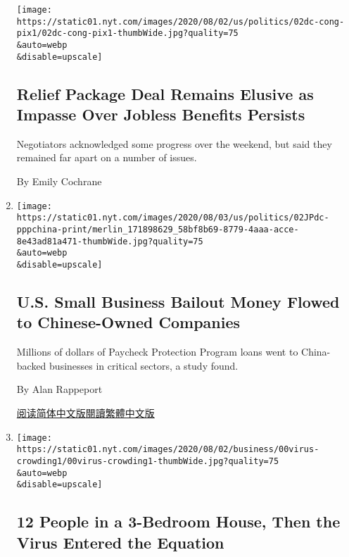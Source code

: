 \begin{enumerate}
  \texttt{[image: https://static01.nyt.com/images/2020/08/02/us/politics/02dc-cong-pix1/02dc-cong-pix1-thumbWide.jpg?quality=75\\\&auto=webp\\\&disable=upscale]}

  \hypertarget{relief-package-deal-remains-elusive-as-impasse-over-jobless-benefits-persists}{%
  \subsection{Relief Package Deal Remains Elusive as Impasse Over
  Jobless Benefits
  Persists}\label{relief-package-deal-remains-elusive-as-impasse-over-jobless-benefits-persists}}

  Negotiators acknowledged some progress over the weekend, but said they
  remained far apart on a number of issues.

  By Emily Cochrane
\item
  \href{/2020/08/02/us/politics/virus-china-ppp-small-business-loans.html}{}

  \texttt{[image: https://static01.nyt.com/images/2020/08/03/us/politics/02JPdc-pppchina-print/merlin\_171898629\_58bf8b69-8779-4aaa-acce-8e43ad81a471-thumbWide.jpg?quality=75\\\&auto=webp\\\&disable=upscale]}

  \hypertarget{us-small-business-bailout-money-flowed-to-chinese-owned-companies}{%
  \subsection{U.S. Small Business Bailout Money Flowed to Chinese-Owned
  Companies}\label{us-small-business-bailout-money-flowed-to-chinese-owned-companies}}

  Millions of dollars of Paycheck Protection Program loans went to
  China-backed businesses in critical sectors, a study found.

  By Alan Rappeport

  \href{https://cn.nytimes.com/usa/20200803/virus-china-ppp-small-business-loans/}{阅读简体中文版}\href{https://cn.nytimes.com/usa/20200803/virus-china-ppp-small-business-loans/zh-hant/}{閱讀繁體中文版}
\item
  \href{/2020/08/01/business/economy/housing-overcrowding-coronavirus.html}{}

  \texttt{[image: https://static01.nyt.com/images/2020/08/02/business/00virus-crowding1/00virus-crowding1-thumbWide.jpg?quality=75\\\&auto=webp\\\&disable=upscale]}

  \hypertarget{12-people-in-a-3-bedroom-house-then-the-virus-entered-the-equation}{%
  \subsection{12 People in a 3-Bedroom House, Then the Virus Entered the
  Equation}\label{12-people-in-a-3-bedroom-house-then-the-virus-entered-the-equation}}


\end{enumerate}

